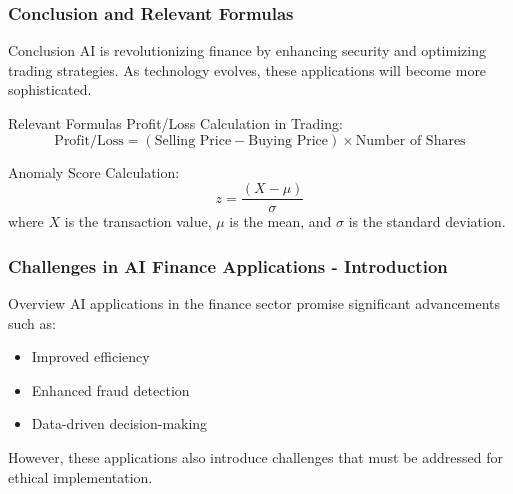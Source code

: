 \documentclass[aspectratio=169]{beamer}
\begin{document}
\begin{frame}[fragile]
    \frametitle{Conclusion and Relevant Formulas}
    \begin{block}{Conclusion}
        AI is revolutionizing finance by enhancing security and optimizing trading strategies. As technology evolves, these applications will become more sophisticated.
    \end{block}
    
    \begin{block}{Relevant Formulas}
        Profit/Loss Calculation in Trading:
        \begin{equation}
            \text{Profit/Loss} = (\text{Selling Price} - \text{Buying Price}) \times \text{Number of Shares}
        \end{equation}
        
        Anomaly Score Calculation:
        \begin{equation}
            z = \frac{(X - \mu)}{\sigma}
        \end{equation}
        where $X$ is the transaction value, $\mu$ is the mean, and $\sigma$ is the standard deviation.
    \end{block}
\end{frame}

\begin{frame}[fragile]
    \frametitle{Challenges in AI Finance Applications - Introduction}
    \begin{block}{Overview}
        AI applications in the finance sector promise significant advancements such as:
        \begin{itemize}
            \item Improved efficiency
            \item Enhanced fraud detection
            \item Data-driven decision-making
        \end{itemize}
        However, these applications also introduce challenges that must be addressed for ethical implementation.
    \end{block}
\end{frame}
\end{document}
